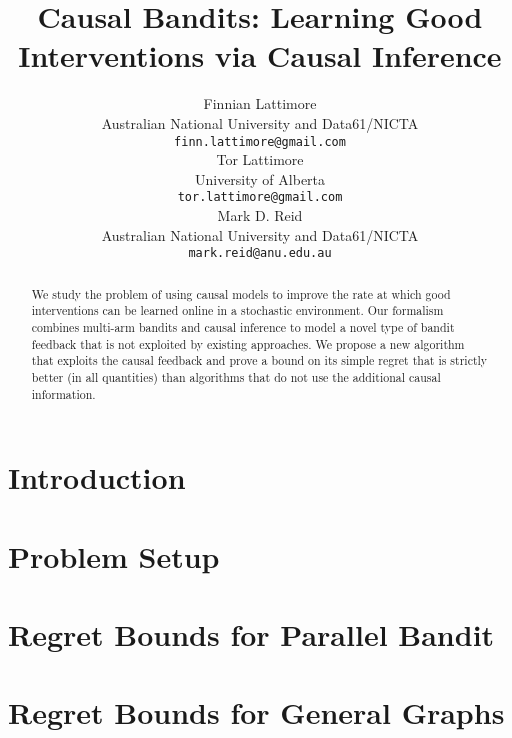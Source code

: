 \documentclass{article}
\title{Causal Bandits: Learning Good Interventions via Causal Inference}
\author{
  Finnian Lattimore \\
  Australian National University and Data61/NICTA \\
  \texttt{finn.lattimore@gmail.com} \\
   \And
   Tor Lattimore \\
   University of Alberta \\
   \texttt{tor.lattimore@gmail.com} \\
   \And
   Mark D. Reid \\
   Australian National University and Data61/NICTA \\
   \texttt{mark.reid@anu.edu.au} \\
}
\theoremstyle{plain}
\theoremstyle{definition}
\begin{document}


\maketitle

\begin{abstract} 
We study the problem of using causal models to improve the rate at which good interventions can be learned online in a stochastic environment. 
Our formalism combines multi-arm bandits and causal inference to model a novel type of bandit feedback that is not exploited by existing approaches.
We propose a new algorithm that exploits the causal feedback and prove a bound on its simple regret that is strictly better (in all quantities) 
than algorithms that do not use the additional causal information.
\end{abstract} 




\vspace{-.5cm}
\section{Introduction}
\label{sec:intro}


\section{Problem Setup}
\label{sec:defs}


\section{Regret Bounds for Parallel Bandit}
\label{sec:simple-regret}




\section{Regret Bounds for General Graphs}
\label{sec:simple-regret-general}

 
\end{document}

